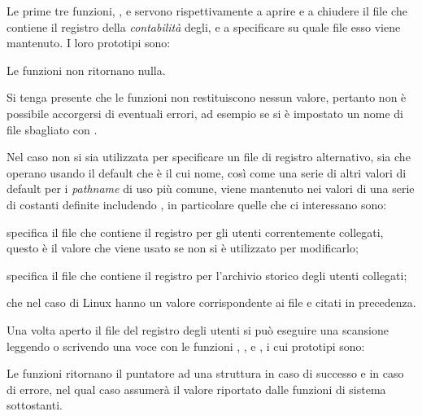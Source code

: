 Le prime tre funzioni, ,  e 
servono rispettivamente a aprire e a chiudere il file che contiene il registro
della \textsl{contabilità} degli, e a specificare su quale file esso viene
mantenuto. I loro prototipi sono:

\begin{funcproto}{
}

{Le funzioni non ritornano nulla.}  
\end{funcproto}

Si tenga presente che le funzioni non restituiscono nessun valore, pertanto
non è possibile accorgersi di eventuali errori, ad esempio se si è impostato
un nome di file sbagliato con .

Nel caso non si sia utilizzata  per specificare un file di
registro alternativo, sia  che  operano usando
il default che è  il cui nome, così come una serie di
altri valori di default per i \textit{pathname} di uso più comune, viene
mantenuto nei valori di una serie di costanti definite includendo
, in particolare quelle che ci interessano sono:
\begin{basedescript}{\desclabelwidth{2.0cm}}
\item[\constd{\_PATH\_UTMP}] specifica il file che contiene il registro per
  gli utenti correntemente collegati, questo è il valore che viene usato se
  non si è utilizzato  per modificarlo;
\item[\constd{\_PATH\_WTMP}] specifica il file che contiene il registro per
  l'archivio storico degli utenti collegati;
\end{basedescript}
che nel caso di Linux hanno un valore corrispondente ai file
 e  citati in precedenza.

Una volta aperto il file del registro degli utenti si può eseguire una
scansione leggendo o scrivendo una voce con le funzioni ,
,  e , i cui prototipi sono:


\begin{funcproto}{
}

{Le funzioni ritornano il puntatore ad una struttura  in caso di
  successo e  in caso di errore, nel qual caso  assumerà
  il valore riportato dalle funzioni di sistema sottostanti.}
\end{funcproto}


